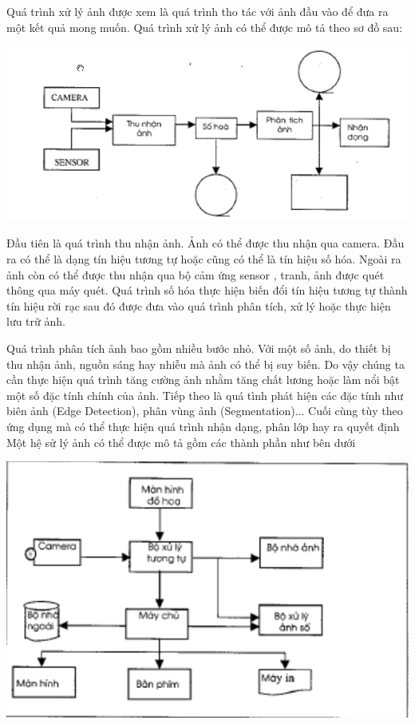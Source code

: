 \documentclass[12pt,oneside,a4]{report}
\begin{document}
Quá trình xử lý ảnh được xem là quá trình tho tác với ảnh đầu vào để đưa ra một kết quả mong muốn. Quá trình xử lý ảnh có thể được mô tả theo sơ đồ sau:
\begin{center}
\includegraphics[scale=0.7]{figure/htxulyanh.png}
\end{center}
Đầu tiên là quá trình thu nhận ảnh. Ảnh có thể được thu nhận qua camera. Đầu ra có thể là dạng tín hiệu tương tự hoặc cũng có thể là tín hiệu số hóa. Ngoài ra ảnh còn có thể được thu nhận qua bộ cảm ứng sensor , tranh, ảnh được quét thông qua máy quét.
Quá trình số hóa thực hiện biến đổi tín hiệu tương tự thành tín hiệu rời rạc sau đó được đưa vào quá trình phân tích, xử lý hoặc thực hiện lưu trữ ảnh.

Quá trình phân tích ảnh bao gồm nhiều bước nhỏ. Với một số ảnh, do thiết bị thu nhận ảnh, nguồn sáng hay nhiễu mà ảnh có thể bị suy biến. Do vậy chúng ta cần thực hiện quá trình tăng cường ảnh nhằm tăng chất lương hoặc làm nổi bật một số đặc tính chính của ảnh. Tiếp theo là quá tình phát hiện các đặc tính như biên ảnh (Edge Detection), phân vùng ảnh (Segmentation)...
Cuối cùng tùy theo ứng dụng mà có thể thực hiện quá trình nhận dạng, phân lớp hay ra quyết định 
Một hệ sử lý ảnh có thể được mô tả gồm các thành phần như bên dưới
\begin{center}
\includegraphics[]{figure/tpxulyanh.png}
\end{center}
\end{document}
